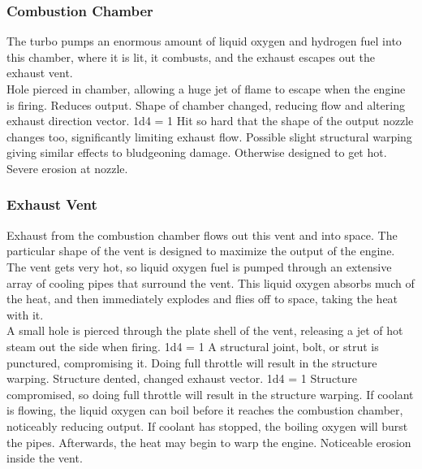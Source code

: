 \documentclass[a4paper]{article}
\begin{document}
\vspace{-0.5cm} \hspace{-18pt} \subsubsection{Combustion Chamber} \label{engine_combustion} \vspace{-0.2cm}
The turbo pumps an enormous amount of liquid oxygen and hydrogen fuel into this chamber, where it is lit, it combusts, and the exhaust escapes out the exhaust vent. 
\\ \pbhw
{Hole pierced in chamber, allowing a huge jet of flame to escape when the engine is firing. Reduces output.}
{Shape of chamber changed, reducing flow and altering exhaust direction vector. \newline 1d4 = 1 Hit so hard that the shape of the output nozzle changes too, significantly limiting exhaust flow. }
{Possible slight structural warping giving similar effects to bludgeoning damage. Otherwise designed to get hot.}
{Severe erosion at nozzle.}


\vspace{-0.5cm} \hspace{-18pt} \subsubsection{Exhaust Vent} \label{engine_exhaust} \vspace{-0.2cm}
Exhaust from the combustion chamber flows out this vent and into space. The particular shape of the vent is designed to maximize the output of the engine. The vent gets very hot, so liquid oxygen fuel is pumped through an extensive array of cooling pipes that surround the vent. This liquid oxygen absorbs much of the heat, and then immediately explodes and flies off to space, taking the heat with it.
\\ \pbhw
{A small hole is pierced through the plate shell of the vent, releasing a jet of hot steam out the side when firing. \newline 1d4 = 1 A structural joint, bolt, or strut is punctured, compromising it. Doing full throttle will result in the structure warping.}
{Structure dented, changed exhaust vector. \newline 1d4 = 1 Structure compromised, so doing full throttle will result in the structure warping.}
{If coolant is flowing, the liquid oxygen can boil before it reaches the combustion chamber, noticeably reducing output. If coolant has stopped, the boiling oxygen will burst the pipes. Afterwards, the heat may begin to warp the engine.}
{Noticeable erosion inside the vent.}
\end{document}
